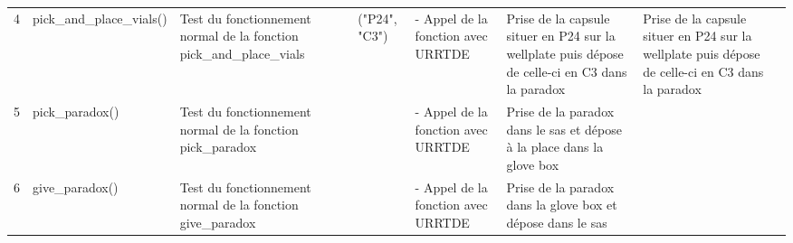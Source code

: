 \documentclass[
    iai, %
    eai, %
]{heig-tb}
\begin{document}
\begin{sidewaystable}[ht]
\begin{tabular}{@{}c|p{3cm}|p{3cm}|p{3cm}|p{3cm}|p{3cm}|p{3cm}|c@{}}
    4                   & pick\_and\_place\_vials()           & Test du fonctionnement normal de la fonction pick\_and\_place\_vials                                                                                                                       & ("P24", "C3")      & - Appel de la fonction avec URRTDE            & Prise de la capsule situer en P24 sur la wellplate puis dépose de celle-ci en C3 dans la paradox & Prise de la capsule situer en P24 sur la wellplate puis dépose de celle-ci en C3 dans la paradox & \cellcolor[HTML]{FFB2B2} \\
    5                   & \multicolumn{1}{l}{pick\_paradox()} & Test du fonctionnement normal de la fonction pick\_paradox                                                                                                                                 &                    & - Appel de la fonction avec URRTDE            & Prise de la paradox dans le sas et dépose à la place dans la glove box                           &                                                                                                  & \cellcolor[HTML]{FFB2B2} \\
    6                   & \multicolumn{1}{l}{give\_paradox()} & Test du fonctionnement normal de la fonction give\_paradox                                                                                                                                 &                    & - Appel de la fonction avec URRTDE            & Prise de la paradox dans la glove box et dépose dans le sas                                      &                                                                                                  & \cellcolor[HTML]{FFB2B2} \\ \bottomrule
    \end{tabular}
\end{sidewaystable}
\let\cleardoublepage\clearpage
\backmatter

\label{glossaire}
\printnoidxglossary
\label{index}
\printindex


\end{document}
